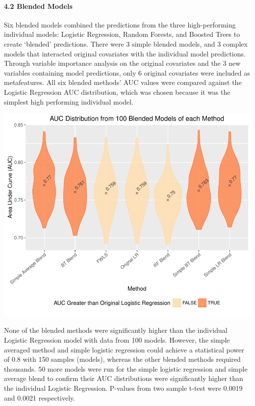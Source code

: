 \documentclass[]{elsarticle} %
\makeatletter
\def\maxwidth{\ifdim\Gin@nat@width>\linewidth\linewidth
\else\Gin@nat@width\fi}
\let\Oldincludegraphics\includegraphics
\renewcommand{\includegraphics}[1]{\Oldincludegraphics[width=\maxwidth]{#1}}
\makeatother
\begin{document}
\paragraph{4.2 Blended Models}\label{blended-models}

Six blended models combined the predictions from the three
high-performing individual models: Logistic Regression, Random Forests,
and Boosted Trees to create `blended' predictions. There were 3 simple
blended models, and 3 complex models that interacted original covariates
with the individual model predictions. Through variable importance
analysis on the original covariates and the 3 new variables containing
model predictions, only 6 original covariates were included as
metafeatures. All six blended methods' AUC values were compared against
the Logistic Regression AUC distribution, which was chosen because it
was the simplest high performing individual model.

\includegraphics{Consulting_Profitability_Paper_files/figure-latex/blend_violin-1.pdf}

None of the blended methods were significantly higher than the
individual Logistic Regression model with data from 100 models. However,
the simple averaged method and simple logistic regression could achieve
a statistical power of 0.8 with 150 samples (models), whereas the other
blended methods required thousands. 50 more models were run for the
simple logistic regression and simple average blend to confirm their AUC
distributions were significantly higher than the individual Logistic
Regression. P-values from two sample t-test were 0.0019 and 0.0021
respectively.
\end{document}
